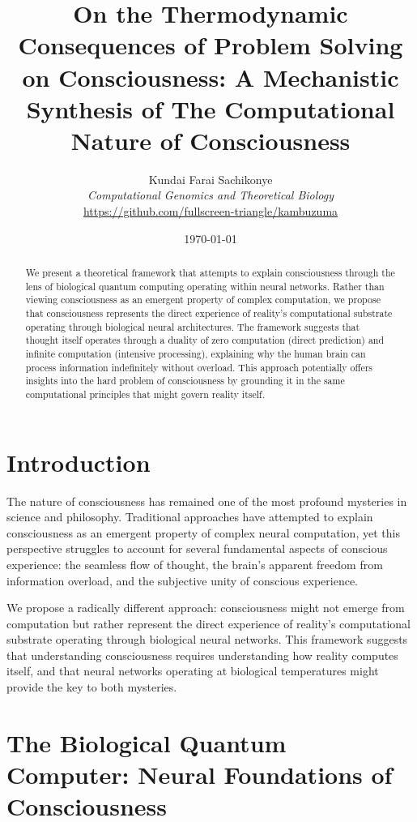 \documentclass[12pt]{article}
\title{ On the Thermodynamic Consequences of Problem Solving on Consciousness: A Mechanistic Synthesis of The Computational Nature of Consciousness}
\author{
Kundai Farai Sachikonye\\
\textit{Computational Genomics and Theoretical Biology}\\
\url{https://github.com/fullscreen-triangle/kambuzuma}
}
\date{\today}
\begin{document}
\maketitle

\begin{abstract}
We present a theoretical framework that attempts to explain consciousness through the lens of biological quantum computing operating within neural networks. Rather than viewing consciousness as an emergent property of complex computation, we propose that consciousness represents the direct experience of reality's computational substrate operating through biological neural architectures. The framework suggests that thought itself operates through a duality of zero computation (direct prediction) and infinite computation (intensive processing), explaining why the human brain can process information indefinitely without overload. This approach potentially offers insights into the hard problem of consciousness by grounding it in the same computational principles that might govern reality itself.
\end{abstract}

\tableofcontents

\section{Introduction}

The nature of consciousness has remained one of the most profound mysteries in science and philosophy. Traditional approaches have attempted to explain consciousness as an emergent property of complex neural computation, yet this perspective struggles to account for several fundamental aspects of conscious experience: the seamless flow of thought, the brain's apparent freedom from information overload, and the subjective unity of conscious experience.

We propose a radically different approach: consciousness might not emerge from computation but rather represent the direct experience of reality's computational substrate operating through biological neural networks. This framework suggests that understanding consciousness requires understanding how reality computes itself, and that neural networks operating at biological temperatures might provide the key to both mysteries.

\section{The Biological Quantum Computer: Neural Foundations of Consciousness}
\end{document}
